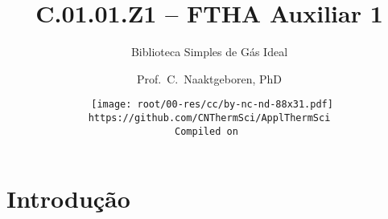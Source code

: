 \makeatletter
\immediate{} %
\makeatother



\title{C.01.01.Z1 -- FTHA Auxiliar 1}
\subtitle{Biblioteca Simples de Gás Ideal}
\author{Prof.~C.~Naaktgeboren, PhD}
\date{{\scriptsize\tt%
    \texttt{[image: root/00-res/cc/by-nc-nd-88x31.pdf]}\\[\smallskipamount]
    https://github.com/CNThermSci/ApplThermSci\\
    Compiled on 
}}

\logo{%
    \parbox{158mm}{%
        \texttt{[image: root/00-res/UTFPR/UTFPR-logo-D.pdf]}\hfill%
        \texttt{[image: root/00-res/logo/CNThermSci-logo-A.pdf]}%
}} %
\frame{\titlepage}

\section{Introdução}

